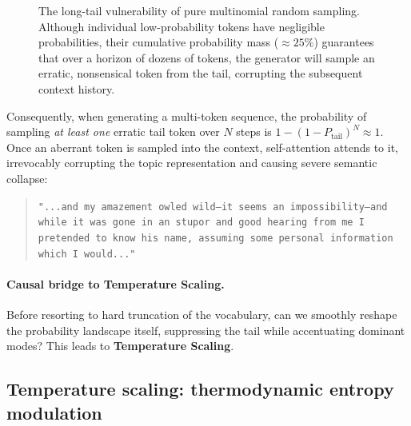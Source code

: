 \documentclass[../../main.tex]{subfiles}
\begin{document}
\begin{figure}[htbp]
\begin{tikzpicture}
\end{tikzpicture}
\caption{The long-tail vulnerability of pure multinomial random sampling. Although individual low-probability tokens have negligible probabilities, their cumulative probability mass ($\approx 25\%$) guarantees that over a horizon of dozens of tokens, the generator will sample an erratic, nonsensical token from the tail, corrupting the subsequent context history.}
\label{fig:random_sampling_tail_risk}
\end{figure}

Consequently, when generating a multi-token sequence, the probability of sampling \emph{at least one} erratic tail token over $N$ steps is $1 - (1 - P_{\text{tail}})^N \approx 1$. Once an aberrant token is sampled into the context, self-attention attends to it, irrevocably corrupting the topic representation and causing severe semantic collapse:
\begin{quote}
\texttt{"...and my amazement owled wild--it seems an impossibility--and while it was gone in an stupor and good hearing from me I pretended to know his name, assuming some personal information which I would..."}
\end{quote}

\paragraph{Causal bridge to Temperature Scaling.}
Before resorting to hard truncation of the vocabulary, can we smoothly reshape the probability landscape itself, suppressing the tail while accentuating dominant modes? This leads to \textbf{Temperature Scaling}.

\subsection{Temperature scaling: thermodynamic entropy modulation}
\label{subsec:temperature_scaling}
\end{document}
